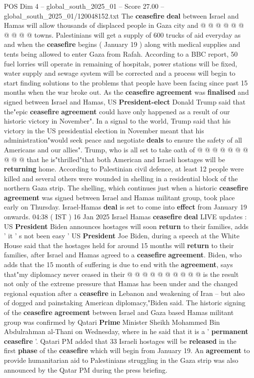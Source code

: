 \begin{textsample}{POS Dim 4 – global\_south\_2025\_01 – Score 27.00 – global\_south\_2025\_01/120048152.txt}
The \textbf{ceasefire} \textbf{deal} between Israel and Hamas will allow thousands of displaced people in Gaza city and @ @ @ @ @ @ @ @ @ @ towns.
Palestinians will get a supply of 600 trucks of aid everyday as and when the \textbf{ceasefire} begins ( January 19 ) along with medical supplies and tents being allowed to enter Gaza from Rafah.
According to a BBC report, 50 fuel lorries will operate in remaining of hospitals, power stations will be fixed, water supply and sewage system will be corrected and a process will begin to start finding solutions to the problems that people have been facing since past 15 months when the war broke out.
As the \textbf{ceasefire} \textbf{agreement} was \textbf{finalised} and signed between Israel and Hamas, US \textbf{President-elect} Donald Trump said that the"epic \textbf{ceasefire} \textbf{agreement} could have only happened as a result of our historic victory in November".
In a signal to the world, Trump said that his victory in the US presidential election in November meant that his administration"would seek peace and negotiate \textbf{deals} to ensure the safety of all Americans and our allies".
Trump, who is all set to take oath of @ @ @ @ @ @ @ @ @ @ that he is"thrilled"that both American and Israeli hostages will be \textbf{returning} home.
According to Palestinian civil defence, at least 12 people were killed and several others were wounded in shelling in a residential block of the northern Gaza strip.
The shelling, which continues just when a historic \textbf{ceasefire} \textbf{agreement} was signed between Israel and Hamas militant group, took place early on Thursday.
Israel-Hamas \textbf{deal} is set to come into \textbf{effect} from January 19 onwards. 04:38 ( IST ) 16 Jan 2025 Israel Hamas \textbf{ceasefire} \textbf{deal} LIVE updates : US \textbf{President} Biden announces hostages will soon \textbf{return} to their families, adds ' it ' s not been easy ' US \textbf{President} Joe Biden, during a speech at the White House said that the hostages held for around 15 months will \textbf{return} to their families, after Israel and Hamas agreed to a \textbf{ceasefire} \textbf{agreement}.
Biden, who adds that the 15 month of suffering is due to end with the \textbf{agreement}, says that"my diplomacy never ceased in their @ @ @ @ @ @ @ @ @ @ is the result not only of the extreme pressure that Hamas has been under and the changed regional equation after a \textbf{ceasefire} in Lebanon and weakening of Iran -- but also of dogged and painstaking American diplomacy,"Biden said.
The historic signing of the \textbf{ceasefire} \textbf{agreement} between Israel and Gaza based Hamas militant group was confirmed by Qatari \textbf{Prime} Minister Sheikh Mohammed Bin Abdulrahman al-Thani on Wednesday, where in he said that it is a ' \textbf{permanent} \textbf{ceasefire} '.
Qatari PM added that 33 Israeli hostages will be \textbf{released} in the first \textbf{phase} of the \textbf{ceasefire} which will begin from January 19.
An \textbf{agreement} to provide humanitarian aid to Palestinians struggling in the Gaza strip was also announced by the Qatar PM during the press briefing.


\end{textsample}
